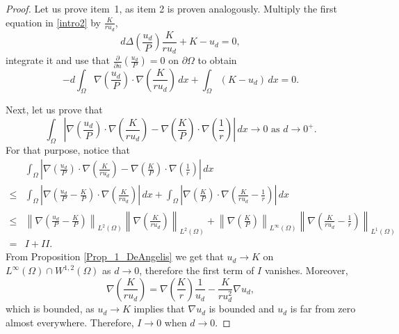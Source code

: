 \documentclass[10pt,a4paper]{amsart}
\newcommand{\module}[1]{\left|#1\right|}
\newcommand{\norm}[1]{\left\|#1\right\|}
\newcommand{\parentheses}[1]{\left(#1\right)}
\begin{document}
\begin{proof}
        Let us prove item~1, as item 2 is proven analogously. Multiply the first equation in  \eqref{intro2} by $\frac{K}{ru_d}$,
        \begin{equation*}
            d\Delta\parentheses{\frac{u_d}{P}}\frac{K}{ru_d}+K-u_d=0,
        \end{equation*}
        integrate it and use that $\frac{\partial}{\partial n}(\frac{u_d}{P})=0$ on $\partial\Omega$ to obtain
        \begin{equation}\label{Eq.1 Feb14th}
            -d\int_\Omega\nabla\parentheses{\frac{u_d}{P}}\cdot\nabla\parentheses{\frac{K}{ru_d}}\,dx+\int_\Omega(K-u_d)\,dx=0.
        \end{equation}
        
        Next, let us prove that
        \begin{equation*}
            \int_\Omega\module{\nabla\parentheses{\frac{u_d}{P}}\cdot\nabla\parentheses{\frac{K}{ru_d}}-\nabla\parentheses{\frac{K}{P}}\cdot\nabla\parentheses{\frac{1}{r}}}\,dx\to0 \textrm{ as } d\to0^+. 
        \end{equation*}
        For that purpose, notice that 
        \begin{align*}
            &\int_\Omega\module{\nabla\parentheses{\frac{u_d}{P}}\cdot\nabla\parentheses{\frac{K}{ru_d}}-\nabla\parentheses{\frac{K}{P}}\cdot\nabla\parentheses{\frac{1}{r}}}\,dx\\
            \leq&\int_\Omega\module{\nabla\parentheses{\frac{u_d}{P}-\frac{K}{P}}\cdot\nabla\parentheses{\frac{K}{ru_d}} }\,dx+\int_\Omega\module{\nabla\parentheses{\frac{K}{P}}\cdot\nabla\parentheses{\frac{K}{ru_d} -\frac{1}{r}}  }\,dx\\
            \leq&\norm{\nabla\parentheses{\frac{u_d}{P}-\frac{K}{P}}}_{L^2(\Omega)}\norm{\nabla\parentheses{\frac{K}{ru_d}}}_{L^2(\Omega)}+\norm{\nabla\parentheses{\frac{K}{P}}}_{L^\infty(\Omega)}\norm{\nabla\parentheses{\frac{K}{ru_d}-\frac{1}{r}}}_{L^1(\Omega)}\\
            =&I+II.
        \end{align*}
    From Proposition \ref{Prop_1_DeAngelis} we get that $u_d\to K$ on $L^\infty(\Omega)\cap W^{1,2}(\Omega)$ as $d\to0$, therefore the first term of $I$ vanishes. Moreover,
    \begin{equation*}
        \nabla\parentheses{\frac{K}{ru_d}}=\nabla\parentheses{\frac{K}{r}}\frac{1}{u_d}-\frac{K}{ru_d^2}\nabla u_d,
    \end{equation*}
    which is bounded, as $u_d\to K$ implies that $\nabla u_d$ is bounded and $u_d$ is far from zero almost everywhere. Therefore, $I\to0$ when $d\to0$.



\end{proof}
\end{document}
